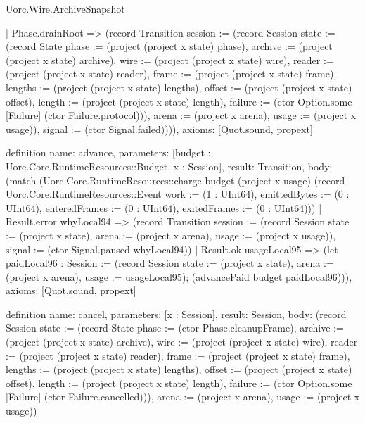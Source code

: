 \begin{lexlean}{Uorc.Wire.ArchiveSnapshot}
\begin{semanticmodule}
{      | Phase.drainRoot => (record Transition {session := (record Session {state := (record State {phase := (project (project x state) phase), archive := (project (project x state) archive), wire := (project (project x state) wire), reader := (project (project x state) reader), frame := (project (project x state) frame), lengths := (project (project x state) lengths), offset := (project (project x state) offset), length := (project (project x state) length), failure := (ctor Option.some [Failure] (ctor Failure.protocol))}), arena := (project x arena), usage := (project x usage)}), signal := (ctor Signal.failed)}))),
  axioms: [Quot.sound, propext]
}

definition{
  name: advance,
  parameters: [budget : Uorc.Core.RuntimeResources::Budget, x : Session],
  result: Transition,
  body: (match (Uorc.Core.RuntimeResources::charge budget (project x usage) (record Uorc.Core.RuntimeResources::Event {work := (1 : UInt64), emittedBytes := (0 : UInt64), enteredFrames := (0 : UInt64), exitedFrames := (0 : UInt64)}))
    | Result.error whyLocal94 => (record Transition {session := (record Session {state := (project x state), arena := (project x arena), usage := (project x usage)}), signal := (ctor Signal.paused whyLocal94)})
    | Result.ok usageLocal95 => (let paidLocal96 : Session := (record Session {state := (project x state), arena := (project x arena), usage := usageLocal95}); (advancePaid budget paidLocal96))),
  axioms: [Quot.sound, propext]
}

definition{
  name: cancel,
  parameters: [x : Session],
  result: Session,
  body: (record Session {state := (record State {phase := (ctor Phase.cleanupFrame), archive := (project (project x state) archive), wire := (project (project x state) wire), reader := (project (project x state) reader), frame := (project (project x state) frame), lengths := (project (project x state) lengths), offset := (project (project x state) offset), length := (project (project x state) length), failure := (ctor Option.some [Failure] (ctor Failure.cancelled))}), arena := (project x arena), usage := (project x usage)})
}


\end{semanticmodule}
\end{lexlean}
